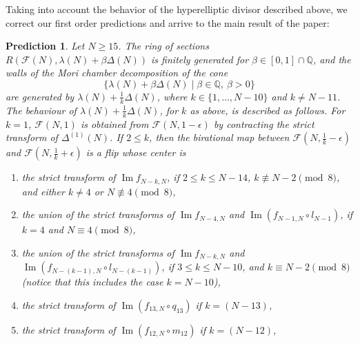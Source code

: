 \documentclass[11pt]{amsart}
\numberwithin{equation}{subsection}
\theoremstyle{plain}
\newtheorem{prediction}[theorem]{Prediction}
\theoremstyle{remark}
\theoremstyle{definition}
\newcommand{\bQ}{\mathbb{Q}}
\newcommand{\im}{\operatorname{Im}}
\newcommand{\cF}{{\mathscr F}}
\newcommand{\QQ}{{\mathbb Q}}
\begin{document}
Taking into account the behavior of the hyperelliptic divisor described above, we  correct our first order predictions and arrive to the main result of the paper:
%
\begin{prediction}\label{pred:mainpred}
%
Let $N\ge 15$. The ring of sections   $R(\cF(N), \lambda(N)+\beta\Delta(N))$ is finitely generated for $\beta\in[0,1]\cap \bQ$, and  the walls of the Mori chamber decomposition of the cone 
%
\begin{equation*}
%
\{\lambda(N)+\beta\Delta(N) \mid \beta\in\QQ,\ \beta>0\} 
%
\end{equation*}
%
 are generated by 
$\lambda(N)+\frac{1}{k}\Delta(N)$, where
$k\in\{1,\ldots,N-10\}$ and $k\not=N-11$.
The behaviour of $\lambda(N)+\frac{1}{k}\Delta(N)$, for $k$ as above, is described as follows. For $k=1$, $\cF(N,1)$ is obtained from $\cF(N,1-\epsilon)$ by contracting the strict transform of $\Delta^{(1)}(N)$. 
If $2\le k$, then the birational map between $\cF(N,\frac{1}{k}-\epsilon)$ and 
$\cF(N,\frac{1}{k}+\epsilon)$ is a flip whose center is
%
\begin{enumerate}
%
\item the strict transform of $\im f_{N-k,N}$, if  $2\le k\le N-14$, $k\not\equiv N-2\pmod{8}$, and either $k\not=4$ or $N\not\equiv 4\pmod{8}$,
%
\item the  union of the strict transforms of $\im f_{N-4,N}$ and $\im(f_{N-1,N}\circ l_{N-1})$,  if $k=4$ and $N\equiv 4\pmod{8}$, 
%
\item the union of the strict transforms of $\im f_{N-k,N}$ and $\im(f_{N-(k-1),N}\circ l_{N-(k-1)})$,  if  $3\le k\le N-10$, and $k\equiv N-2\pmod{8}$ (notice that this includes the case $k=N-10$),
%
\item the strict transform of $\im(f_{13,N}\circ q_{13})$ if $k=(N-13)$,
%
\item the strict transform of $\im(f_{12,N}\circ m_{12})$ if $k=(N-12)$,
%
\end{enumerate}
%
\end{prediction}
\end{document}
